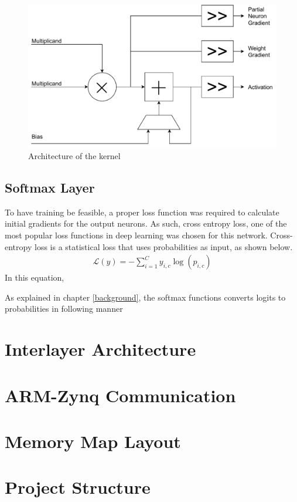\begin{figure}
	\centering 
	\includegraphics[width=5in]{figures/kernel_arch}
	\caption{Architecture of the kernel}\label{kernel-arch}
\end{figure}

\subsection{Softmax Layer}
To have training be feasible, a proper loss function was required to calculate initial gradients for the output neurons. As such, cross entropy loss, one of the most popular loss functions in deep learning was chosen for this network. Cross-entropy loss is a statistical loss that uses probabilities as input, as shown below.
\begin{align}
\mathcal{L}(y) = - \sum_{i = 1}^{C}y_{i,c}\log(p_{i,c})
\end{align}
In this equation, 

As explained in chapter \ref{background}, the softmax functions converts logits to probabilities in following manner

\section{Interlayer Architecture}
\section{ARM-Zynq Communication}
\section{Memory Map Layout}

\section{Project Structure}


